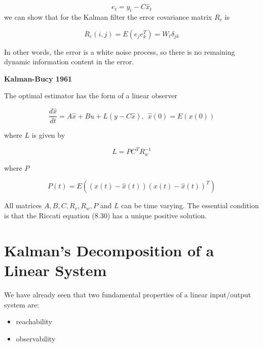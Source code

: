 \begin{equation}
e_t = y_t - C\hat{x}_t
\end{equation}
we can show that for the Kalman filter the error covariance matrix $R_e$ is

\begin{equation}
R_e(i,j) = E(e_{j}e_{k}^{T}) = W_t\delta_{jk} 
\end{equation}

In other words, the error is a white noise process, so there is no remaining dynamic information content in the error.




\begin{framed}
\theoremstyle{theorem}
\begin{theorem}{\textbf{Kalman-Bucy 1961}}


The optimal estimator has the form of a linear observer 

\begin{equation}
\frac{d\hat{x}}{dt} = A\hat{x} + Bu + L(y - C\hat{x}),  ~~ \hat{x}(0) = E(x(0)) \nonumber
\end{equation} 

where $L$ is given by

\begin{equation}
L = PC^TR_{w}^{-1}  \nonumber
\end{equation}

where $P$

\begin{equation}
P(t) = E((x(t)-\hat{x}(t))(x(t)-\hat{x}(t))^T)  \nonumber
\end{equation}

\end{theorem}
\end{framed}


All matrices $A, B, C, R_v, R_w, P$ and $L$ can be time varying. The essential condition is that the Riccati equation (8.30) has a unique positive 
solution.

\section{Kalman’s Decomposition of a Linear System}

We have already seen that two fundamental properties
of a linear input/output system are:

\begin{itemize}
\item reachability 
\item observability
\end{itemize}

